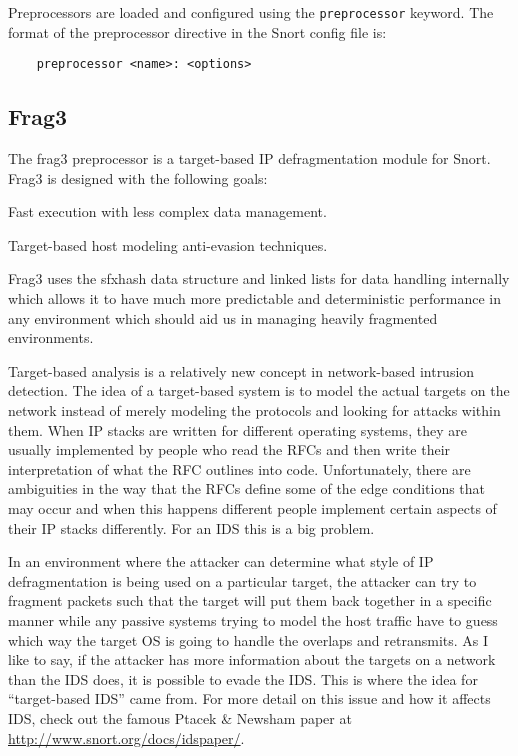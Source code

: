 \documentclass[english]{report}
\newcounter{slistnum}
\newenvironment{slist}
{ \begin{list}{ {\bf \arabic{slistnum}.} }{\usecounter{slistnum} } }
{ \end{list} }
\begin{document}
Preprocessors are loaded and configured using the {\tt preprocessor} keyword.
The format of the preprocessor directive in the Snort config file is:

\begin{verbatim}
    preprocessor <name>: <options>
\end{verbatim}

\subsection{Frag3}
\label{frag3 section}

The frag3 preprocessor is a target-based IP defragmentation module for Snort.
Frag3 is designed with the following goals:

\begin{slist}
\item Fast execution with less complex data management.
\item Target-based host modeling anti-evasion techniques.
\end{slist}

Frag3 uses the sfxhash data structure and linked lists for data handling
internally which allows it to have much more predictable and deterministic
performance in any environment which should aid us in managing heavily
fragmented environments.

Target-based analysis is a relatively new concept in network-based intrusion
detection.  The idea of a target-based system is to model the actual targets on
the network instead of merely modeling the protocols and looking for attacks
within them.  When IP stacks are written for different operating systems, they
are usually implemented by people who read the RFCs and then write their
interpretation of what the RFC outlines into code.  Unfortunately, there are
ambiguities in the way that the RFCs define some of the edge conditions that
may occur and when this happens different people implement certain aspects of
their IP stacks differently.  For an IDS this is a big problem.

In an environment where the attacker can determine what style of IP
defragmentation is being used on a particular target, the attacker can try to
fragment packets such that the target will put them back together in a specific
manner while any passive systems trying to model the host traffic have to guess
which way the target OS is going to handle the overlaps and retransmits.  As I
like to say, if the attacker has more information about the targets on a
network than the IDS does, it is possible to evade the IDS.  This is where the
idea for ``target-based IDS'' came from.  For more detail on this issue and how
it affects IDS, check out the famous Ptacek \& Newsham paper at
\url{http://www.snort.org/docs/idspaper/}.
\end{document}
